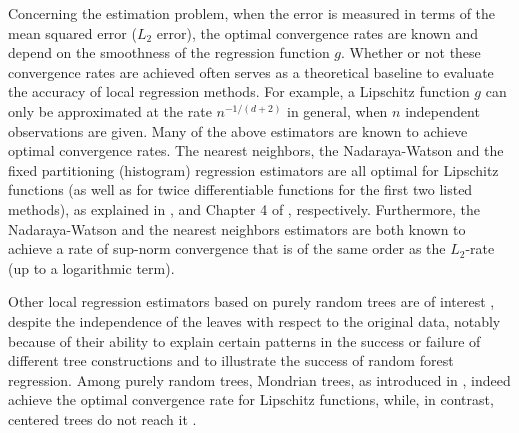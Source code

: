 \documentclass[paper=a4, fontsize=11pt]{scrartcl}
\begin{document}
% 
%
Concerning the estimation problem, when the error is measured in terms of the mean squared error ($L_2$ error), the optimal convergence rates are known \cite{stone1982optimal} and depend on the smoothness of the regression function $g$. Whether or not these convergence rates are achieved often serves as a theoretical baseline to evaluate the accuracy of local regression methods. For example, a Lipschitz function $g$ can only be approximated at the rate $ n ^{- 1/ (d+2)  }$ in general, when $n $ independent observations are given. Many of the above estimators are known to achieve optimal convergence rates. The nearest neighbors, the Nadaraya-Watson and the fixed partitioning (histogram) regression estimators are all optimal for Lipschitz functions (as well as for twice differentiable functions for the first two listed methods), as explained in \cite{biau2015lectures},  \cite{tsy_08} and Chapter 4 of \cite{gyorfi2006distribution}, respectively. Furthermore, the Nadaraya-Watson \cite{einmahl2000,gine+g:02} and the nearest neighbors \cite{jiang2019non,portier2021nearest} estimators are both known to achieve a rate of sup-norm convergence that is of the same order as the $L_2$-rate (up to a logarithmic term). 

Other local regression estimators based on purely random trees are of interest \cite{biau2016random}, despite the independence of the leaves with respect to the original data, notably because of their ability to explain certain patterns in the success or failure of different tree constructions and to illustrate the success of random forest regression. Among purely random trees, Mondrian trees, as introduced in \cite{lakshminarayanan2014mondrian}, indeed achieve the optimal convergence rate \cite{mondrian} for Lipschitz functions, while, in contrast, centered trees do not reach it \cite{biau2012analysis,klusowski2021sharp}. 
\end{document}
